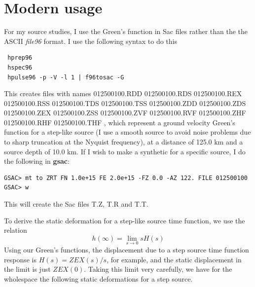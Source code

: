 \documentclass{article}
\begin{document}
\section{Modern usage}
For my source studies, I use the Green's function in Sac files rather than the the ASCII {\it file96} format. I use the following syntax
to do this
\begin{verbatim}
 hprep96
 hspec96
 hpulse96 -p -V -l 1 | f96tosac -G
\end{verbatim}
This creates files with names 012500100.RDD  012500100.RDS  012500100.REX  012500100.RSS  012500100.TDS  012500100.TSS  012500100.ZDD  012500100.ZDS	012500100.ZEX  012500100.ZSS 012500100.ZVF 012500100.RVF 012500100.ZHF 012500100.RHF 012500100.THF , which represent
a ground velocity Green's function for a step-like source (I use a smooth source to avoid noise problems due to sharp truncation at the Nyquist frequency), at a distance of 125.0 km and a source depth of 10.0 km.
If I wish to make a synthetic for a specific source, I do the following in  {\bf gsac}:
\begin{verbatim}
GSAC> mt to ZRT FN 1.0e+15 FE 2.0e+15 -FZ 0.0 -AZ 122. FILE 012500100
GSAC> w
\end{verbatim}
This will create the Sac files T.Z, T.R and T.T.


To derive the static deformation for a step-like source time function, we use the relation
\begin{equation*}
h ( \infty ) = \lim_{ s \to 0 } s H(s) 
\end{equation*}
Using our Green's functions, the displacement due to a step source time function response is $H(s) = ZEX(s)/s $, for example, and the
static displacement in the limit is just $ZEX (0)$. Taking this limit very carefully, we have for the wholespace the following static deformations for a step source.
\end{document}
